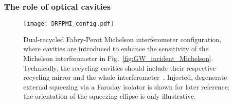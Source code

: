 
\subsubsection{The role of optical cavities}

\begin{figure}
	\centering
	\texttt{[image: DRFPMI\_config.pdf]}
	\caption{Dual-recycled Fabry-Perot Michelson interferometer configuration, where cavities are introduced to enhance the sensitivity of the Michelson interferometer in Fig.~\ref{fig:GW_incident_Michelson}. Technically, the recycling cavities should include their respective recycling mirror and the whole interferometer~\cite{meersRecyclingLaserinterferometricGravitationalwave1988,1995AuJPh..48..953M}. Injected, degenerate external squeezing via a Faraday isolator is shown for later reference; the orientation of the squeezing ellipse is only illustrative.}
	\label{fig:DRFPMI}
\end{figure}

